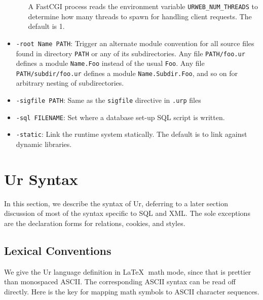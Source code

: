 \documentclass{article}
\begin{document}
\begin{itemize}
\begin{itemize}
    A FastCGI process reads the environment variable \texttt{URWEB\_NUM\_THREADS} to determine how many threads to spawn for handling client requests.  The default is 1.
  \end{itemize}

\item \texttt{-root Name PATH}: Trigger an alternate module convention for all source files found in directory \texttt{PATH} or any of its subdirectories.  Any file \texttt{PATH/foo.ur} defines a module \texttt{Name.Foo} instead of the usual \texttt{Foo}.  Any file \texttt{PATH/subdir/foo.ur} defines a module \texttt{Name.Subdir.Foo}, and so on for arbitrary nesting of subdirectories.

\item \texttt{-sigfile PATH}: Same as the \texttt{sigfile} directive in \texttt{.urp} files

\item \texttt{-sql FILENAME}: Set where a database set-up SQL script is written.

\item \texttt{-static}: Link the runtime system statically.  The default is to link against dynamic libraries.
\end{itemize}


\section{Ur Syntax}

In this section, we describe the syntax of Ur, deferring to a later section discussion of most of the syntax specific to SQL and XML.  The sole exceptions are the declaration forms for relations, cookies, and styles.

\subsection{Lexical Conventions}

We give the Ur language definition in \LaTeX $\;$ math mode, since that is prettier than monospaced ASCII.  The corresponding ASCII syntax can be read off directly.  Here is the key for mapping math symbols to ASCII character sequences.
\end{document}
